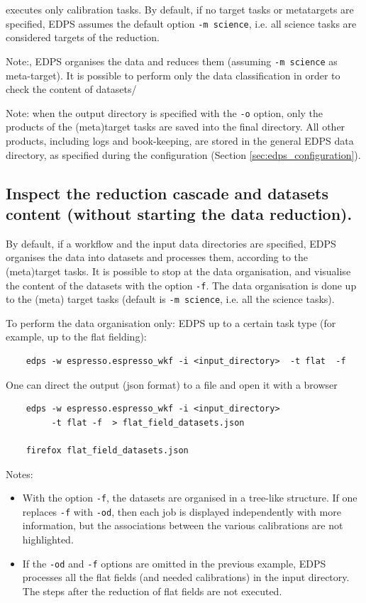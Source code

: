 executes only calibration tasks. By default, if no target tasks or metatargets are specified, EDPS assumes the default option {\tt -m science}, i.e. all science tasks are considered targets of the reduction.

Note:, EDPS organises the data and reduces them (assuming {\tt -m science} as meta-target). It is possible to perform only the data classification in order to check the content of datasets/

Note: when the output directory is specified with the {\tt -o} option, only the products of the (meta)target tasks are saved into the final directory. All other products, including logs and book-keeping, are stored in the general EDPS data directory, as specified during the configuration (Section \ref{sec:edps_configuration}).

\subsection{Inspect the reduction cascade and datasets content (without starting the data reduction).}
\label{sec:edps_cascade}

By default,  if a workflow and the input data directories are specified, EDPS organises the data into datasets and processes them, according to the (meta)target tasks. It is possible to stop at the data organisation, and visualise the content of the datasets with the option {\tt -f}. The data organisation is done up to the (meta) target tasks (default is {\tt -m science}, i.e. all the science tasks).

To perform the data organisation only: EDPS up to a certain task type (for example, up to the flat fielding):
 
\begin{verbatim}
    edps -w espresso.espresso_wkf -i <input_directory>  -t flat  -f 
\end{verbatim}
One can direct the output (json format) to a file and open it with a browser
\begin{verbatim}
    edps -w espresso.espresso_wkf -i <input_directory> 
         -t flat -f  > flat_field_datasets.json
         
    firefox flat_field_datasets.json
\end{verbatim}

Notes:

\begin{itemize}
\item With the option {\tt -f}, the datasets are organised in a tree-like structure. If one replaces {\tt -f} with {\tt -od}, then each job is displayed independently with more information, but the associations between the various calibrations are not highlighted.

\item If the {\tt -od} and {\tt -f} options are omitted in the previous example, EDPS processes all the flat fields (and needed calibrations) in the input directory. The steps after the reduction of flat fields are not executed.
\end{itemize}
